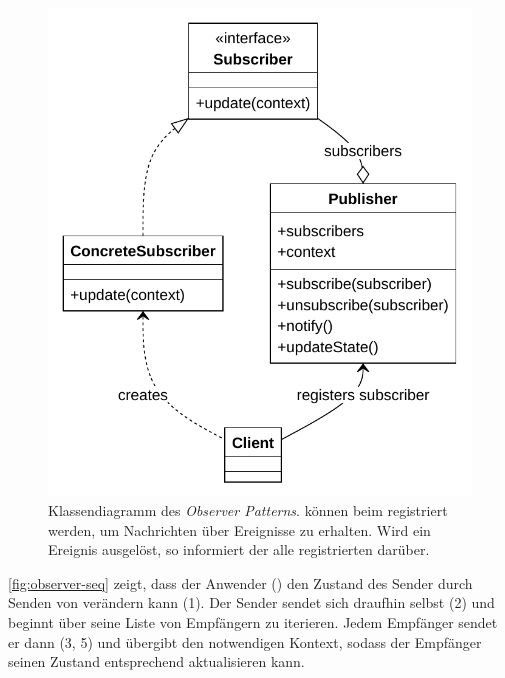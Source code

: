 \begin{figure}[!ht]
	\centering
	\includegraphics[width=0.95\linewidth]{images/patterns/observer-class.pdf}
	\caption{Klassendiagramm des \emph{Observer Patterns}.  können beim  registriert werden, um Nachrichten über Ereignisse zu erhalten. Wird ein Ereignis ausgelöst, so informiert der  alle registrierten  darüber. \cite{skobeleva_observer_2023}}
	\label{fig:observer-class}
\end{figure}

\autoref{fig:observer-seq} zeigt, dass der Anwender () den Zustand des Sender durch Senden von  verändern kann (1). Der Sender sendet sich draufhin selbst  (2) und beginnt über seine Liste von Empfängern zu iterieren. Jedem Empfänger sendet er dann  (3, 5) und übergibt den notwendigen Kontext, sodass der Empfänger seinen Zustand entsprechend aktualisieren kann.

